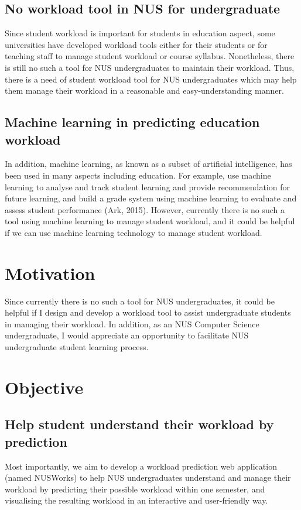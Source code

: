\documentclass[fyp]{socreport}
\begin{document}
\subsection{No workload tool in NUS for undergraduate}
Since student workload is important for students in education aspect, some universities have developed workload tools either for their students or for teaching staff to manage student workload or course syllabus. Nonetheless, there is still no such a tool for NUS undergraduates to maintain their workload. Thus, there is a need of student workload tool for NUS undergraduates which may help them manage their workload in a reasonable and easy-understanding manner.

\subsection{Machine learning in predicting education workload}
In addition, machine learning, as known as a subset of artificial intelligence, has been used in many aspects including education. For example, use machine learning to analyse and track student learning and provide recommendation for future learning, and build a grade system using machine learning to evaluate and assess student performance (Ark, 2015). However, currently there is no such a tool using machine learning to manage student workload, and it could be helpful if we can use machine learning technology to manage student workload.

\section{Motivation}
Since currently there is no such a tool for NUS undergraduates, it could be helpful if I design and develop a workload tool to assist undergraduate students in managing their workload. In addition, as an NUS Computer Science undergraduate, I would appreciate an opportunity to facilitate NUS undergraduate student learning process.

\section{Objective}
\subsection{Help student understand their workload by prediction}
Most importantly, we aim to develop a workload prediction web application (named NUSWorks) to help NUS undergraduates understand and manage their workload by predicting their possible workload within one semester, and visualising the resulting workload in an interactive and user-friendly way.
\end{document}

